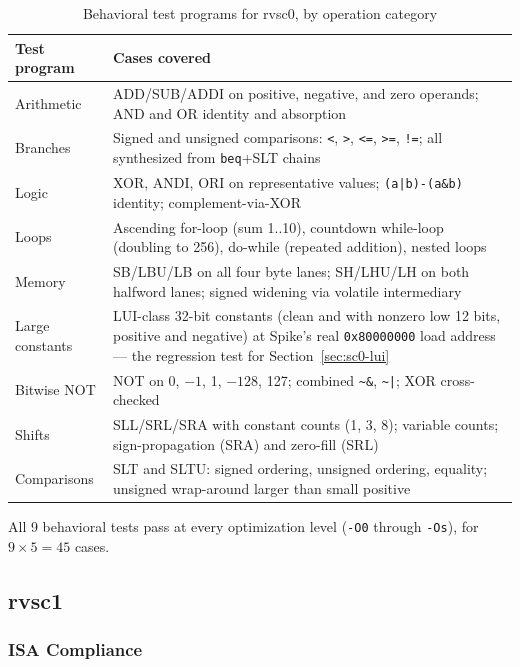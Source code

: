 \begin{table}[htb]
\centering
\caption{Behavioral test programs for rvsc0, by operation category}
\label{tab:sc0-behav-files}
\begin{tabular}{p{2.6cm}p{11.9cm}}
\toprule
\textbf{Test program} & \textbf{Cases covered} \\
\midrule
Arithmetic  & ADD/SUB/ADDI on positive, negative, and zero operands; AND and OR identity and absorption \\
Branches    & Signed and unsigned comparisons: \texttt{<}, \texttt{>}, \texttt{<=}, \texttt{>=}, \texttt{!=}; all synthesized from \texttt{beq}+SLT chains \\
Logic       & XOR, ANDI, ORI on representative values; \texttt{(a|b)-(a\&b)} identity; complement-via-XOR \\
Loops       & Ascending for-loop (sum 1..10), countdown while-loop (doubling to 256), do-while (repeated addition), nested loops \\
Memory      & SB/LBU/LB on all four byte lanes; SH/LHU/LH on both halfword lanes; signed widening via volatile intermediary \\
Large constants & LUI-class 32-bit constants (clean and with nonzero low 12 bits, positive and negative) at Spike's real \texttt{0x80000000} load address --- the regression test for Section~\ref{sec:sc0-lui} \\
Bitwise NOT & NOT on 0, $-1$, 1, $-128$, 127; combined \texttt{\~{}\&}, \texttt{\~{}|}; XOR cross-checked \\
Shifts      & SLL/SRL/SRA with constant counts (1, 3, 8); variable counts; sign-propagation (SRA) and zero-fill (SRL) \\
Comparisons & SLT and SLTU: signed ordering, unsigned ordering, equality; unsigned wrap-around larger than small positive \\
\bottomrule
\end{tabular}
\end{table}

All 9 behavioral tests pass at every optimization level (\texttt{-O0} through \texttt{-Os}), for
$9 \times 5 = 45$ cases.

\subsection{rvsc1}

\subsubsection{ISA Compliance} \label{sec:sc1-isa-tests}

